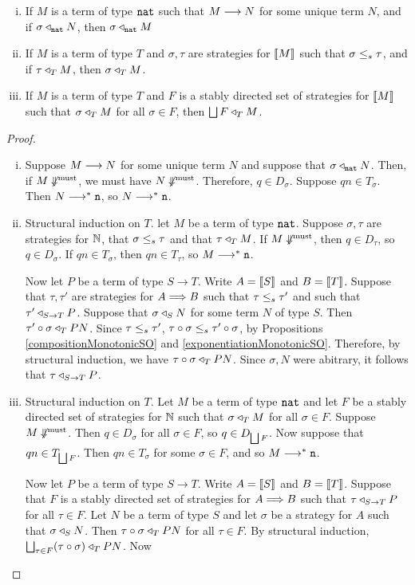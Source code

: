 \documentclass{article}
\begin{document}
\begin{lemma}
  \begin{enumerate}[i)]
    \item If $M$ is a term of type ${\mathtt{nat}}$ such that $M\longrightarrow N$ for some unique term $N$, and if $\sigma\triangleleft_{\mathtt{nat}} N$, then $\sigma\triangleleft_{\mathtt{nat}} M$
    \item If $M$ is a term of type $T$ and $\sigma,\tau$ are strategies for $\left\llbracket M\right\rrbracket$ such that $\sigma{\;\le_s\;}\tau$, and if $\tau\triangleleft_TM$, then $\sigma\triangleleft_TM$.
    \item If $M$ is a term of type $T$ and $F$ is a stably directed set of strategies for $\left\llbracket M\right\rrbracket$ such that $\sigma\triangleleft_TM$ for all $\sigma\in F$, then $\bigsqcup F\triangleleft_TM$.  
  \end{enumerate}
  \begin{proof}
    \begin{enumerate}[(i):]
      \item Suppose $M\longrightarrow N$ for some unique term $N$ and suppose that $\sigma\triangleleft_{\mathtt{nat}} N$.  Then, if $M\not\Downarrow^{\text{must}}$, we must have $N\not\Downarrow^{\text{must}}$.  Therefore, $q\in D_\sigma$.  Suppose $qn\in T_\sigma$.  Then $N\longrightarrow^*{\mathtt{n}}$, so $N\longrightarrow^*{\mathtt{n}}$.
      \item Structural induction on $T$.  let $M$ be a term of type ${\mathtt{nat}}$.  Suppose $\sigma,\tau$ are strategies for $\mathbb{N}$, that $\sigma{\;\le_s\;}\tau$ and that $\tau\triangleleft_T M$.  If $M\not\Downarrow^{\text{must}}$, then $q\in D_\tau$, so $q\in D_\sigma$.  If $qn\in T_\sigma$, then $qn\in T_\tau$, so $M\longrightarrow^*{\mathtt{n}}$.

        Now let $P$ be a term of type $S\to T$.  Write $A=\left\llbracket S\right\rrbracket$ and $B=\left\llbracket T\right\rrbracket$.  Suppose that $\tau,\tau'$ are strategies for $A\Longrightarrow B$ such that $\tau{\;\le_s\;}\tau'$ and such that $\tau'\triangleleft_{S\to T}P$.  Suppose that $\sigma\triangleleft_SN$ for some term $N$ of type $S$.  Then $\tau' \circ \sigma\triangleleft_TPN$.  Since $\tau{\;\le_s\;}\tau'$, $\tau \circ \sigma{\;\le_s\;}\tau' \circ \sigma$, by Propositions \ref{compositionMonotonicSO} and \ref{exponentiationMonotonicSO}.  Therefore, by structural induction, we have $\tau \circ \sigma\triangleleft_TPN$.  Since $\sigma,N$ were abitrary, it follows that $\tau\triangleleft_{S\to T}P$.
      \item Structural induction on $T$.  Let $M$ be a term of type ${\mathtt{nat}}$ and let $F$ be a stably directed set of strategies for $\mathbb{N}$ such that $\sigma\triangleleft_TM$ for all $\sigma\in F$.  Suppose $M\not\Downarrow^{\text{must}}$.  Then $q\in D_\sigma$ for all $\sigma\in F$, so $q\in D_{\bigsqcup F}$.  Now suppose that $qn\in T_{\bigsqcup F}$.  Then $qn\in T_\sigma$ for some $\sigma\in F$, and so $M\longrightarrow^*{\mathtt{n}}$.

        Now let $P$ be a term of type $S\to T$.  Write $A=\left\llbracket S\right\rrbracket$ and $B=\left\llbracket T\right\rrbracket$.  Suppose that $F$ is a stably directed set of strategies for $A\Longrightarrow B$ such that $\tau\triangleleft_{S\to T}P$ for all $\tau\in F$.  Let $N$ be a term of type $S$ and let $\sigma$ be a strategy for $A$ such that $\sigma\triangleleft_SN$.  Then $\tau \circ \sigma\triangleleft_TPN$ for all $\tau\in F$.  By structural induction, $\bigsqcup_{\tau\in F}(\tau \circ \sigma)\triangleleft_TPN$.  Now 
        \qedhere
    \end{enumerate}
  \end{proof}
\end{lemma}



\end{document}
